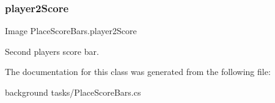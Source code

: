 \subsubsection{\texorpdfstring{player2\+Score}{player2Score}}
{\footnotesize\ttfamily Image Place\+Score\+Bars.\+player2\+Score}



Second player\textquotesingle{}s score bar. 



The documentation for this class was generated from the following file\+:\begin{DoxyCompactItemize}
\item 
background tasks/Place\+Score\+Bars.\+cs\end{DoxyCompactItemize}
